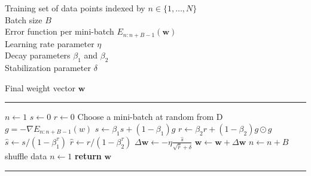 \documentclass{article}
\begin{document}
\begin{algorithm}
\caption{7.4. Adam optimization}
\begin{algorithmic}
\Input
  \begin{minipage}[t]{0.82\linewidth}
    Training set of data points indexed by $n \in \{1,\dots,N\}$\\
    Batch size $B$\\
    Error function per mini-batch $E_{n:n+B-1}(\mathbf{w})$\\
    Learning rate parameter $\eta$\\
    Decay parameters $\beta_1$ and $\beta_2$\\
    Stabilization parameter $\delta$
  \end{minipage}
\Output Final weight vector $\mathbf{w}$

\noindent\rule{\linewidth}{0.05em}

\State $n \leftarrow 1$
\State $s \leftarrow 0$
\State $r \leftarrow 0$
\Repeat
  \State Choose a mini-batch at random from D 
  \State $g=-\nabla E_{n:n+B-1}(w)$ 
  \State $s\leftarrow \beta_1s + (1-\beta_1)g$
  \State $r\leftarrow \beta_2r + (1-\beta_2)g\odot g$ 
  \State $\hat{s}\leftarrow s/(1-\beta_1^\tau)$
  \State $\hat{r}\leftarrow r/(1-\beta_2^\tau)$
  \State $\Delta \mathbf{w} \leftarrow -\eta \frac{\hat{s}}{\sqrt{\hat{r}}+\delta}$
  \State $\mathbf{w}\leftarrow \mathbf{w} + \Delta \mathbf{w}$ 
  \State $n \leftarrow n + B$
    \State shuffle data
    \State $n \gets 1$
  \EndIf
{}
\State \textbf{return} $\mathbf{w}$
\end{algorithmic}
\end{algorithm}

\noindent\rule{\linewidth}{0.4pt}
\end{document}
